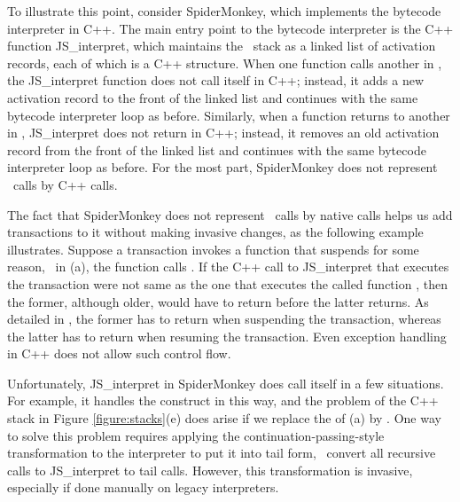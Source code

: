 To illustrate this point, consider SpiderMonkey, which implements the bytecode
interpreter in C++.  The main entry point to the bytecode interpreter is the
C++ function \textsf{JS\_interpret}, which maintains the \js\ stack as a linked
list of activation records, each of which is a C++ structure. When one
function calls another in \js,
%
 the \textsf{JS\_interpret} function does not
call itself in C++; instead, it adds a new activation record to the front of
the linked list and continues with the same bytecode interpreter loop as
before.  Similarly, when a function returns to another in \js,
\textsf{JS\_interpret} does not return in C++; instead, it removes an old
activation record from the front of the linked list and continues with the same
bytecode interpreter loop as before.  For the most part, SpiderMonkey does not
represent \js\ calls by C++ calls.

The fact that SpiderMonkey does not represent \js\ calls by native calls helps
us add transactions to it without making invasive changes, as the following
example illustrates.  Suppose a transaction invokes a function  that
suspends for some reason, \eg~in (a), the function
 calls .  If the C++ call to \textsf{JS\_interpret}
that executes the transaction were not same as the one that executes the called
function , then the former, although older, would have to return before
the latter returns. As detailed in , the former has to
return when suspending the transaction, whereas the latter has to return when
resuming the transaction.  Even exception handling in C++ does not allow such
control flow.

Unfortunately, \textsf{JS\_interpret} in SpiderMonkey does call itself in a few
situations.  For example, it handles the  construct in this way, and
the problem of the C++ stack in Figure \ref{figure:stacks}(e) does arise if we
replace the  of
(a) by 
%
.
%
One way to solve this problem requires applying the
continuation-passing-style transformation to the interpreter to put it into tail
form, \ie~convert all recursive calls to \textsf{JS\_interpret} to tail calls.
However, this transformation is invasive, especially if done manually on legacy
interpreters.

